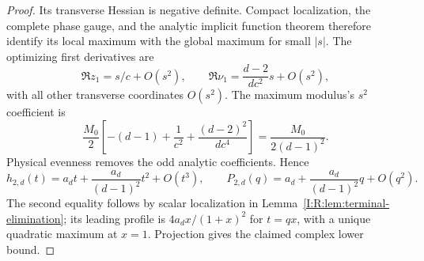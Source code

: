 \begin{proof}
Its transverse Hessian is negative definite.  Compact localization,
the complete phase gauge, and the analytic implicit function theorem
therefore identify its local maximum with the global maximum for
small $|s|$.  The optimizing first derivatives are
\[
 \Re z_1=s/c+O(s^2),\qquad
 \Re\nu_1=\frac{d-2}{dc^2}s+O(s^2),
\]
with all other transverse coordinates $O(s^2)$.  The maximum modulus's
$s^2$ coefficient is
\[
 \frac{M_0}{2}\left[-(d-1)+\frac1{c^2}
                         +\frac{(d-2)^2}{dc^4}\right]
   =\frac{M_0}{2(d-1)^2}.
\]
Physical evenness removes the odd analytic coefficients.  Hence
\begin{equation}
 h_{2,d}(t)=a_dt+\frac{a_d}{(d-1)^2}t^2+O(t^3),\qquad
 P_{2,d}(q)=a_d+\frac{a_d}{(d-1)^2}q+O(q^2).
 \label{I:R:eq:two-state-all-degree-envelope}
\end{equation}
The second equality follows by scalar localization in
Lemma~\ref{I:R:lem:terminal-elimination}; its leading profile is
$4a_dx/(1+x)^2$ for $t=qx$, with a unique quadratic maximum at $x=1$.
Projection gives the claimed complex lower bound.


\end{proof}

